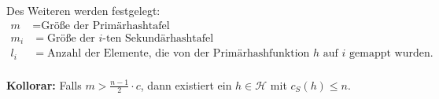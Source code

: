 \documentclass{scrartcl}%
\begin{document}
    \vspace*{0.3cm}
    Des Weiteren werden festgelegt:
    \begin{equation*}
        \begin{align*}
            m &= \text{Größe der Primärhashtafel} \\\nonumber
            m_i &= \text{Größe der $i$-ten Sekundärhashtafel} \\\nonumber
            l_i &= \text{Anzahl der Elemente, die von der Primärhashfunktion $h$ auf $i$ gemappt wurden.} \\\nonumber
        \end{align*}
    \end{equation*}


    \textbf{\textsf{Kollorar:}} Falls $m > \frac{n-1}{2} \cdot c$, dann existiert ein $h \in \mathcal{H}$ mit $c_S(h) \leq n$.
\end{document}
